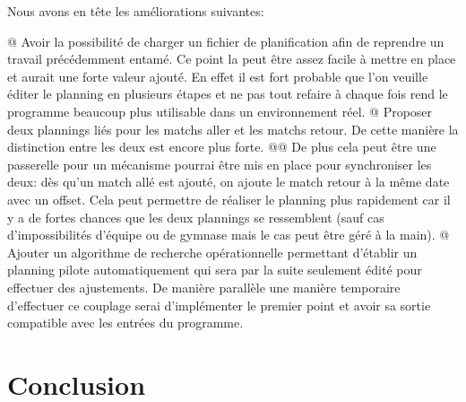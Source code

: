 \documentclass[final, noposter]{polytech/polytech}
\begin{document}
	Nous avons en tête les améliorations suivantes:
	\begin{easylist}[itemize]
		@ Avoir la possibilité de charger un fichier de planification afin de reprendre un travail précédemment entamé.
		Ce point la peut être assez facile à mettre en place et aurait une forte valeur ajouté.
		En effet il est fort probable que l'on veuille éditer le planning en plusieurs étapes et ne pas tout refaire à chaque fois rend le programme beaucoup plus utilisable dans un environnement réel.
		@ Proposer deux plannings liés pour les matchs aller et les matchs retour.
		De cette manière la distinction entre les deux est encore plus forte.
		@@ De plus cela peut être une passerelle pour un mécanisme pourrai être mis en place pour synchroniser les deux: dès qu'un match allé est ajouté, on ajoute le match retour à la même date avec un offset.
		Cela peut permettre de réaliser le planning plus rapidement car il y a de fortes chances que les deux plannings se ressemblent (sauf cas d'impossibilités d'équipe ou de gymnase mais le cas peut être géré à la main).
		@ Ajouter un algorithme de recherche opérationnelle permettant d'établir un planning pilote automatiquement qui sera par la suite seulement édité pour effectuer des ajustements.
		De manière parallèle une manière temporaire d'effectuer ce couplage serai d'implémenter le premier point et avoir sa sortie compatible avec les entrées du programme.
	\end{easylist}

\chapter{Conclusion}
\end{document}

